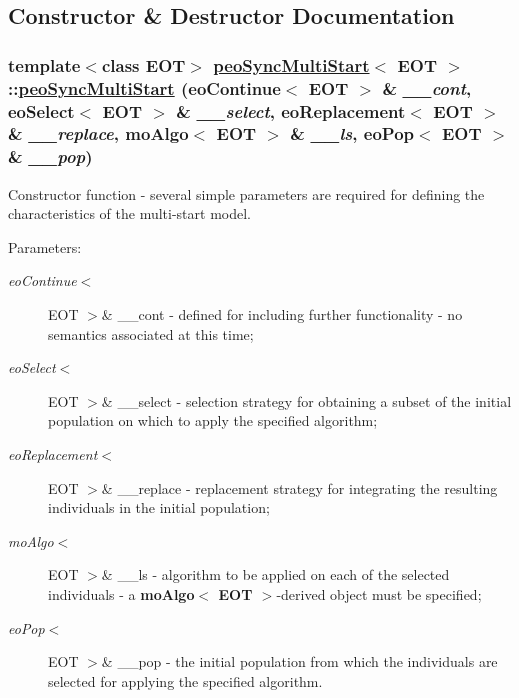 \subsection{Constructor \& Destructor Documentation}
\hypertarget{classpeoSyncMultiStart_d29f94aad3c1f443bfffc8b6aee0704c}{
\subsubsection[peoSyncMultiStart]{\setlength{\rightskip}{0pt plus 5cm}template$<$class EOT$>$ \hyperlink{classpeoSyncMultiStart}{peo\-Sync\-Multi\-Start}$<$ EOT $>$::\hyperlink{classpeoSyncMultiStart}{peo\-Sync\-Multi\-Start} (\bf{eo\-Continue}$<$ EOT $>$ \& {\em \_\-\_\-cont}, \bf{eo\-Select}$<$ EOT $>$ \& {\em \_\-\_\-select}, \bf{eo\-Replacement}$<$ EOT $>$ \& {\em \_\-\_\-replace}, \bf{mo\-Algo}$<$ EOT $>$ \& {\em \_\-\_\-ls}, \bf{eo\-Pop}$<$ EOT $>$ \& {\em \_\-\_\-pop})}}
\label{classpeoSyncMultiStart_d29f94aad3c1f443bfffc8b6aee0704c}


Constructor function - several simple parameters are required for defining the characteristics of the multi-start model. 

\begin{Desc}
\item[Parameters:]
\begin{description}
\item[{\em eo\-Continue$<$}]EOT $>$\& \_\-\_\-cont - defined for including further functionality - no semantics associated at this time; \item[{\em eo\-Select$<$}]EOT $>$\& \_\-\_\-select - selection strategy for obtaining a subset of the initial population on which to apply the specified algorithm; \item[{\em eo\-Replacement$<$}]EOT $>$\& \_\-\_\-replace - replacement strategy for integrating the resulting individuals in the initial population; \item[{\em mo\-Algo$<$}]EOT $>$\& \_\-\_\-ls - algorithm to be applied on each of the selected individuals - a {\bf mo\-Algo$<$ EOT $>$}-derived object must be specified; \item[{\em eo\-Pop$<$}]EOT $>$\& \_\-\_\-pop - the initial population from which the individuals are selected for applying the specified algorithm. \end{description}
\end{Desc}


